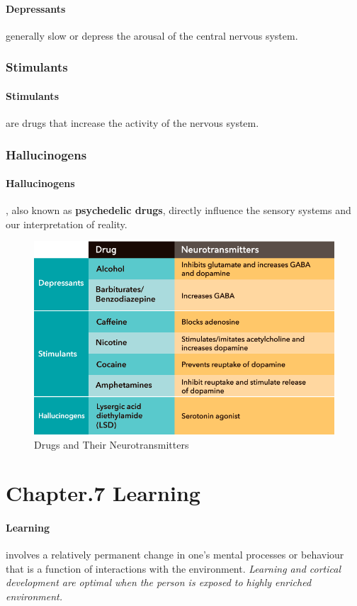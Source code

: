 \documentclass{article}
\begin{document}
	\paragraph{Depressants} generally slow or depress the arousal of the central nervous system.
	\subsubsection{Stimulants}
	\paragraph{Stimulants} are drugs that increase the activity of the nervous system.
	\subsubsection{Hallucinogens}
	\paragraph{Hallucinogens}, also known as \textbf{psychedelic drugs}, directly influence the sensory systems and our interpretation of reality.
	\begin{figure}
		\centering
		\includegraphics[width=\linewidth]{pic/drugs}
		\caption{Drugs and Their Neurotransmitters}
	\end{figure}
\section{Chapter.7 Learning}
	\paragraph{Learning} involves a relatively permanent change in one's mental processes or behaviour that is a function of interactions with the environment. \emph{Learning and cortical development are optimal when the person is exposed to highly enriched environment.}
\end{document}
